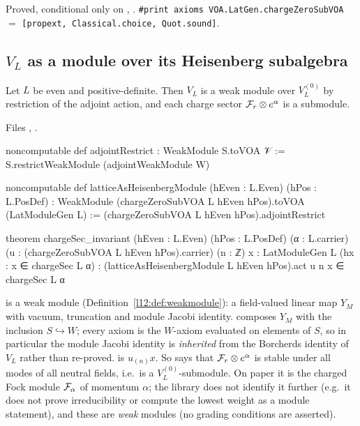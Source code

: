 \begin{status}
Proved, conditional only on , . \texttt{\#print axioms VOA.LatGen.chargeZeroSubVOA} $=$
\texttt{[propext, Classical.choice, Quot.sound]}.
\end{status}

\subsection{\texorpdfstring{$V_L$}{V\_L} as a module over its Heisenberg subalgebra}

\begin{theorem}\label{l05:thm:heismod}
Let $L$ be even and positive-definite. Then $V_L$ is a weak module over $V_L^{(0)}$ by restriction of the adjoint
action, and each charge sector $\mathcal{F}_r\otimes e^\alpha$ is a submodule.
\end{theorem}

\noindent Files , .
\begin{leancode}
noncomputable def adjointRestrict : WeakModule S.toVOA 𝒱 :=
  S.restrictWeakModule (adjointWeakModule W)

noncomputable def latticeAsHeisenbergModule (hEven : L.Even) (hPos : L.PosDef) :
    WeakModule (chargeZeroSubVOA L hEven hPos).toVOA (LatModuleGen L) :=
  (chargeZeroSubVOA L hEven hPos).adjointRestrict

theorem chargeSec_invariant (hEven : L.Even) (hPos : L.PosDef) (α : L.carrier)
    (u : (chargeZeroSubVOA L hEven hPos).carrier) (n : ℤ)
    {x : LatModuleGen L} (hx : x ∈ chargeSec L α) :
    (latticeAsHeisenbergModule L hEven hPos).act u n x ∈ chargeSec L α
\end{leancode}

\begin{dictionary}
 is a weak module (Definition~\ref{l12:def:weakmodule}): a field-valued linear map $Y_M$ with
vacuum, truncation and module Jacobi identity.  composes $Y_M$ with the inclusion
$S\hookrightarrow W$; every axiom is the $W$-axiom evaluated on elements of $S$, so in particular the module Jacobi
identity is \emph{inherited} from the Borcherds identity of $V_L$ rather than re-proved.  is
$u_{(n)}x$. So  says that $\mathcal{F}_r\otimes e^\alpha$ is stable under all modes of all
neutral fields, i.e.\ is a $V_L^{(0)}$-submodule. On paper it is the charged Fock module $\mathcal{F}_\alpha$ of momentum
$\alpha$; the library does not identify it further (e.g.\ it does not prove irreducibility or compute the lowest
weight as a module statement), and these are \emph{weak} modules (no grading conditions are asserted).
\end{dictionary}


